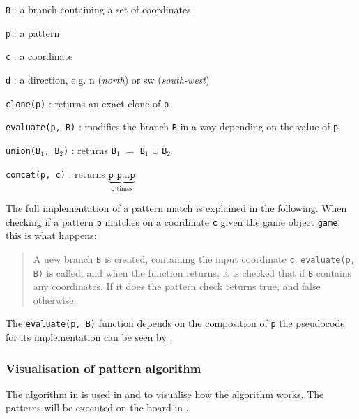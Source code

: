 \begin{dlist}
  \item \texttt{B} : a branch containing a set of coordinates
  \item \texttt{p} : a pattern
  \item \texttt{c} : a coordinate
  \item \texttt{d} : a direction, e.g. n (\textit{north}) or sw
    (\textit{south-west})
  \item \texttt{clone(p)} : returns an exact clone of \texttt{p}
  \item \texttt{evaluate(p, B)} : modifies the branch \texttt{B} in a way
    depending on the value of \texttt{p}
  \item \texttt{union(B$_1$, B$_2$)} : returns \texttt{B$_1$} $=$ \texttt{B$_1$} $\cup$
    \texttt{B$_2$}
  \item \texttt{concat(p, c)} : returns $\underbrace{\texttt{p p} \ldots
    \texttt{p}}_{\texttt{c}\text{ times}}$
\end{dlist}

The full implementation of a pattern match is explained in the following. When
checking if a pattern \texttt{p} matches on a coordinate \texttt{c} given the game object
\texttt{game}, this is what happens: 

\begin{quote}
  A new branch \texttt{B} is created, containing the input coordinate
  \texttt{c}.  \texttt{evaluate(p, B)} is called, and when the function returns,
  it is checked that if \texttt{B} contains any coordinates. If it does the
  pattern check returns true, and false otherwise.  
\end{quote}

The \texttt{evaluate(p, B)} function depends on the composition of \texttt{p} the
pseudocode for its implementation can be seen by .



\subsubsection{Visualisation of pattern algorithm}
\label{sec:vispatternalg}

The algorithm in  is used in  and
 to visualise how the algorithm works. The patterns will be
executed on the board in .

